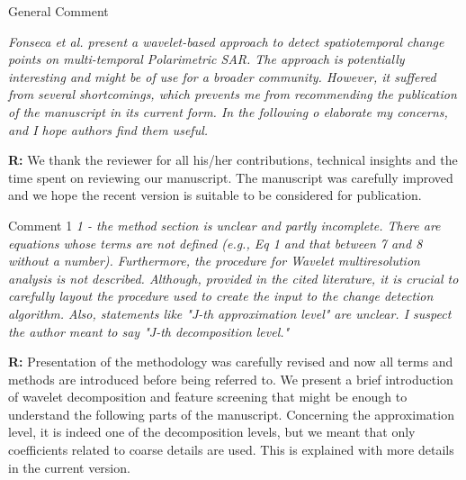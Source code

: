 \documentclass[11pt]{report}
\begin{document}
\begin{mybox}{General Comment}

\textit{Fonseca et al. present a wavelet-based approach to detect spatiotemporal change points on multi-temporal Polarimetric
SAR. The approach is potentially interesting and might be of use for a broader community. However, it suffered from
several shortcomings, which prevents me from recommending the publication of the manuscript in its current form. In the
following o elaborate my concerns, and I hope authors find them useful.}

\medskip

\textbf{R:} We thank the reviewer for all his/her contributions, technical insights and the time
spent on reviewing our manuscript. The manuscript was carefully improved and we hope the recent version is suitable to be considered for publication.
\end{mybox}

\medskip
\begin{mybox}{Comment 1}
\textit{1 - the method section is unclear and partly incomplete. There are equations whose terms are not defined (e.g., Eq 1 and
that between 7 and 8 without a number). Furthermore, the procedure for Wavelet multiresolution analysis is not
described. Although, provided in the cited literature, it is crucial to carefully layout the procedure used to create the input
to the change detection algorithm. Also, statements like "J-th approximation level" are unclear. I suspect the author
meant to say "J-th decomposition level."}


\medskip
\textbf{R:} Presentation of the methodology was carefully revised and now all terms and methods are introduced before being referred to. We present a brief introduction of wavelet decomposition and feature screening that might be enough to understand the following parts of the manuscript. Concerning the approximation level, it is indeed one of the decomposition levels, but we meant that only coefficients related to coarse details are used. This is explained with more details in the current version.
\end{mybox}

\medskip

\end{document}
